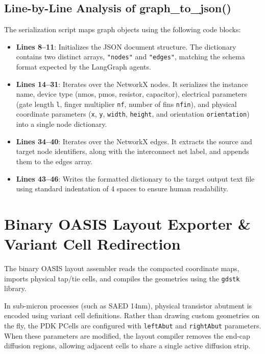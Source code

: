 \subsection{Line-by-Line Analysis of graph\_to\_json()}
The serialization script maps graph objects using the following code blocks:
\begin{itemize}
    \item \textbf{Lines 8--11}: Initializes the JSON document structure. The dictionary contains two distinct arrays, \texttt{"nodes"} and \texttt{"edges"}, matching the schema format expected by the LangGraph agents.
    \item \textbf{Lines 14--31}: Iterates over the NetworkX nodes. It serializes the instance name, device type (nmos, pmos, resistor, capacitor), electrical parameters (gate length \texttt{l}, finger multiplier \texttt{nf}, number of fins \texttt{nfin}), and physical coordinate parameters (\texttt{x}, \texttt{y}, \texttt{width}, \texttt{height}, and orientation \texttt{orientation}) into a single node dictionary.
    \item \textbf{Lines 34--40}: Iterates over the NetworkX edges. It extracts the source and target node identifiers, along with the interconnect net label, and appends them to the edges array.
    \item \textbf{Lines 43--46}: Writes the formatted dictionary to the target output text file using standard indentation of 4 spaces to ensure human readability.
\end{itemize}

\section[OASIS Layout Exporter]{Binary OASIS Layout Exporter \& Variant Cell Redirection}
\label{sec:oasis_exporter}

The binary OASIS layout assembler reads the compacted coordinate maps, imports physical tap/tie cells, and compiles the geometries using the \texttt{gdstk} library. 

In sub-micron processes (such as SAED 14nm), physical transistor abutment is encoded using variant cell definitions. Rather than drawing custom geometries on the fly, the PDK PCells are configured with \texttt{leftAbut} and \texttt{rightAbut} parameters. When these parameters are modified, the layout compiler removes the end-cap diffusion regions, allowing adjacent cells to share a single active diffusion strip.

